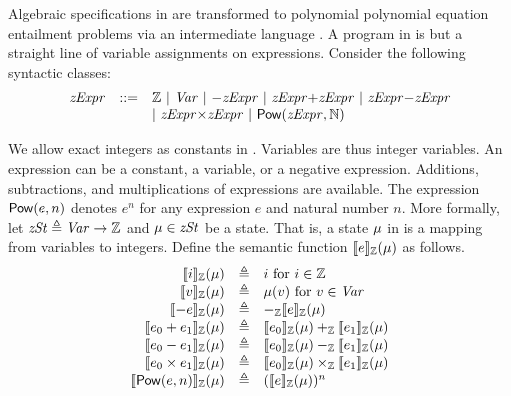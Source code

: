 Algebraic specifications in \bvdsl are transformed to polynomial polynomial equation entailment problems via an intermediate language \zdsl.
A program in \zdsl is but a straight line of variable assignments on expressions.
Consider the following syntactic classes:
\[
\begin{array}{rcl}
  \mathit{zExpr} & ::= & \mathbb{Z} \ |\ \mathit{Var} \ |\  {-}\mathit{zExpr} \ |\
                 \mathit{zExpr} {+} \mathit{zExpr} \ |\ \mathit{zExpr} {-} \mathit{zExpr} \\
  & & |\ \mathit{zExpr} {\times} \mathit{zExpr}  \ |\ \mbox{\textsf{Pow}} (\mathit{zExpr}, \mathbb{N})
\end{array}
\]

We allow exact integers as constants in \zdsl.
Variables are thus integer variables. An expression can be a
constant, a variable, or a negative expression. Additions, subtractions,
and multiplications of expressions are available.
The expression $\mbox{\textsf{Pow}}(e, n)$ denotes $e^n$ for any expression $e$ and natural number $n$.
More formally, let $\mathit{zSt} \triangleq \mathit{Var} \rightarrow
\mathbb{Z}$ and $\mu \in \mathit{zSt}$ be a state. That is,
a {state} $\mu$ in \zdsl is a mapping from variables to integers. Define the
semantic function $[\![{e}]\!]_{\mathbb{Z}}(\mu)$ as follows.
\[
\begin{array}{rcl}
  \zvalueof{{i}}(\zst) & \defn & i \textmd{  for ${i} \in \bbfZ$} \\
  \zvalueof{{v}}(\zst) & \defn & \zst({v}) \textmd{  for ${v} \in \Var$} \\
  \zvalueof{-e}(\zst) & \defn & -_{\bbfZ}\zvalueof{e}(\zst) \\
  \zvalueof{e_0 + e_1}(\zst) & \defn & \zvalueof{e_0}(\zst) +_{\bbfZ} \zvalueof{e_1}(\zst) \\
  \zvalueof{e_0 - e_1}(\zst) & \defn & \zvalueof{e_0}(\zst) -_{\bbfZ} \zvalueof{e_1}(\zst) \\
  \zvalueof{e_0 \times e_1}(\zst) & \defn & \zvalueof{e_0}(\zst) \times_{\bbfZ} \zvalueof{e_1}(\zst) \\
  \zvalueof{\dslcode{Pow}(e, n)}(\zst) & \defn & (\zvalueof{e}(\zst))^n
\end{array}
\]


